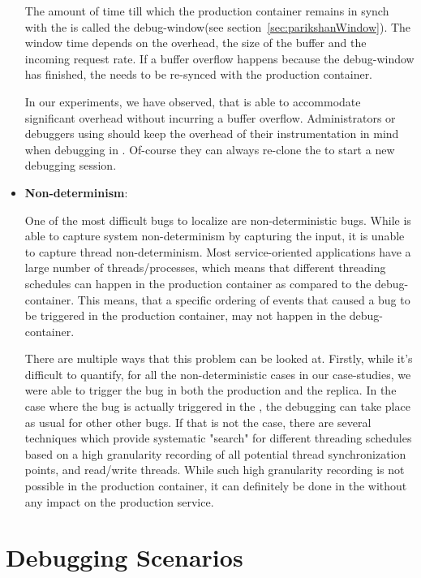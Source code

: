 \begin{itemize}
	The amount of time till which the production container remains in synch with the \debugcontainer is called the debug-window(see section~\ref{sec:parikshanWindow}). The window time depends on the overhead, the size of the buffer and the incoming request rate. If a buffer overflow happens because the debug-window has finished, the \debugcontainer needs to be re-synced with the production container.
	
	In our experiments, we have observed, that \parikshan is able to accommodate significant overhead without incurring a buffer overflow.	
	Administrators or debuggers using \parikshan should keep the overhead of their instrumentation in mind when debugging in \parikshan. Of-course they can always re-clone the \productioncontainer to start a new debugging session.
	
	\item \textbf{Non-determinism}:
	
	One of the most difficult bugs to localize are non-deterministic bugs. While \parikshan is able to capture system non-determinism by capturing the input, it is unable to capture thread non-determinism. Most service-oriented applications have a large number of threads/processes, which means that different threading schedules can happen in the production container as compared to the debug-container.
	This means, that a specific ordering of events that caused a bug to be triggered in the production container, may not happen in the debug-container.
	
	There are multiple ways that this problem can be looked at. Firstly, while it's difficult to quantify, for all the non-deterministic cases in our case-studies, we were able to trigger the bug in both the production and the replica. 
	In the case where the bug is actually triggered in the \debugcontainer, the debugging can take place as usual for other other bugs.
	If that is not the case, there are several techniques which provide systematic "search" for different threading schedules based on a high granularity recording of all potential thread synchronization points, and read/write threads. While such high granularity recording is not possible in the production container, it can definitely be done in the \debugcontainer without any impact on the production service.
	
\end{itemize}

\section{Debugging Scenarios}
\label{sec:activeDebuggingScenarios}


